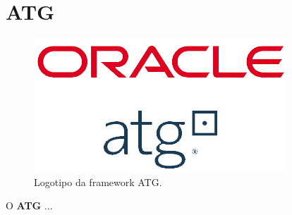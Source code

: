 \section{ATG}
\label{subsec:atg}

\begin{figure}[H]
    \centering
    \includegraphics[scale=0.25]{images/atg.png}
    \caption{Logotipo da framework ATG.}
    \label{fig:atg}
\end{figure}

\hspace{5mm} O \textbf{ATG} ...